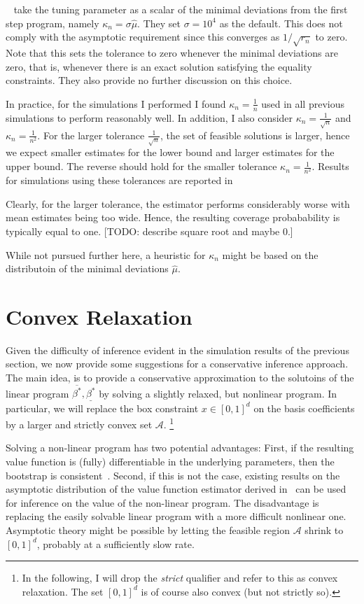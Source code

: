 \documentclass[12pt,a4paper,english]{article} %
\numberwithin{equation}{section}
\theoremstyle{definition}
\theoremstyle{remark}
\theoremstyle{plain}
\begin{document}
~\cite{shea2023ivmte} take the tuning parameter as a scalar of the minimal deviations from the first step program, namely $\kappa_n = \sigma \hat{\mu}$. They set $\sigma = 10^4$ as the default.
This does not comply with the asymptotic requirement since this converges as $1/\sqrt{r_n}$ to zero.
Note that this sets the tolerance to zero whenever the minimal deviations are zero, that is, whenever there is an exact solution satisfying the equality constraints.
They also provide no further discussion on this choice.

In practice, for the simulations I performed I found $\kappa_n = \frac{1}{n}$ used in all previous simulations to perform reasonably well.
In addition, I also consider $\kappa_n = \frac{1}{\sqrt{n}}$ and $\kappa_n = \frac{1}{n^2}$.
For the larger tolerance $\frac{1}{\sqrt{n}}$, the set of feasible solutions is larger, hence we expect smaller estimates for the lower bound and larger estimates for the upper bound.
The reverse should hold for the smaller tolerance $\kappa_n = \frac{1}{n^2}$.
Results for simulations using these tolerances are reported in %

Clearly, for the larger tolerance, the estimator performs considerably worse with mean estimates being too wide.
Hence, the resulting coverage probabability is typically equal to one.
[TODO: describe square root and maybe 0.]

While not pursued further here, a heuristic for $\kappa_n$ might be based on the distributoin of the minimal deviations $\hat{\mu}$.

\section{Convex Relaxation}
Given the difficulty of inference evident in the simulation results of the previous section, we now provide some suggestions for a conservative inference approach.
The main idea, is to provide a conservative approximation to the solutoins of the linear program $\overline{\beta^*}, \underline{\beta^*}$ by solving a slightly relaxed, but nonlinear program.
In particular, we will replace the box constraint $x\in[0,1]^d$ on the basis coefficients by a larger and strictly convex set $\mathcal{A}$.
\footnote{In the following, I will drop the \textit{strict} qualifier and refer to this as convex relaxation. The set $[0,1]^d$ is of course also convex (but not strictly so).}

Solving a non-linear program has two potential advantages:
First, if the resulting value function is (fully) differentiable in the underlying parameters, then the bootstrap is consistent~\citep{fang2019infdirdiff}.
Second, if this is not the case, existing results on the asymptotic distribution of the value function estimator derived in~\cite{shapiro1991asymptotic} can be used for inference on the value of the non-linear program.
The disadvantage is replacing the easily solvable linear program with a more difficult nonlinear one.
Asymptotic theory might be possible by letting the feasible region $\mathcal{A}$ shrink to $[0,1]^d$, probably at a sufficiently slow rate.
\end{document}
